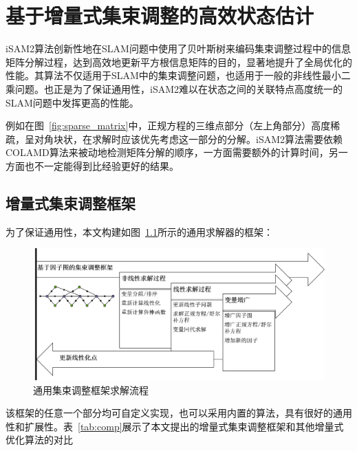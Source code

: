 \chapter{基于增量式集束调整的高效状态估计}\label{ch:ba}

iSAM2算法\cite{kaess2008isam,kaess2012isam2}创新性地在SLAM问题中使用了贝叶斯树来编码集束调整过程中的信息矩阵分解过程，达到高效地更新平方根信息矩阵的目的，显著地提升了全局优化的性能。其算法不仅适用于SLAM中的集束调整问题，也适用于一般的非线性最小二乘问题。也正是为了保证通用性，iSAM2难以在状态之间的关联特点高度统一的SLAM问题中发挥更高的性能。

例如在图~\ref{fig:sparse_matrix}中，正规方程的三维点部分（左上角部分）高度稀疏，呈对角块状，在求解时应该优先考虑这一部分的分解。iSAM2算法需要依赖COLAMD\citep{davis2004algorithm}算法来被动地检测矩阵分解的顺序，一方面需要额外的计算时间，另一方面也不一定能得到比经验更好的结果。





\section{增量式集束调整框架}

为了保证通用性，本文构建如图~\ref{fig:framework}所示的通用求解器的框架：

\begin{figure}[htb!]
    \centering
    \includegraphics[scale=.5]{Pictures/framework.png}
    \caption{通用集束调整框架求解流程}
    \label{fig:framework}
\end{figure}

该框架的任意一个部分均可自定义实现，也可以采用内置的算法，具有很好的通用性和扩展性。表~\ref{tab:comp}展示了本文提出的增量式集束调整框架和其他增量式优化算法的对比

